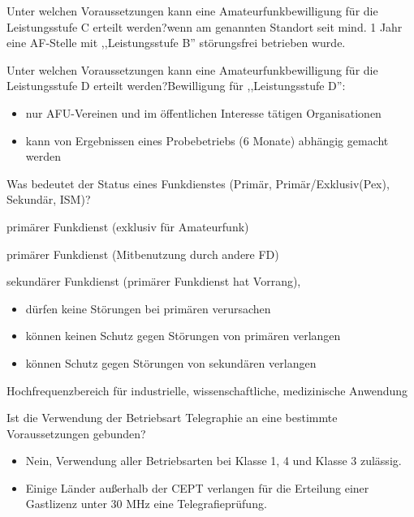 \documentclass[avery5371,grid,frame,a4paper]{flashcards}
\newcommand{\card}[3]{
  \begin{flashcard}[{\chap} -- #1]{#2}#3\end{flashcard}
}
\begin{document}
\card{43}{Unter welchen Voraussetzungen kann eine Amateurfunkbewilligung für die Leistungsstufe C erteilt werden?}{wenn am genannten Standort seit mind. 1 Jahr eine AF-Stelle mit ,,Leistungsstufe B'' störungsfrei betrieben wurde.}

\card{44}{Unter welchen Voraussetzungen kann eine Amateurfunkbewilligung für die Leistungsstufe D erteilt werden?}{Bewilligung für ,,Leistungsstufe D'': \begin{itemize}\itemsep1pt \item nur AFU-Vereinen und im öffentlichen Interesse tätigen Organisationen \item kann von Ergebnissen eines Probebetriebs (6 Monate) abhängig gemacht werden\end{itemize}}

\card{45}{Was bedeutet der Status eines Funkdienstes (Primär, Primär/Exklusiv(Pex), Sekundär, ISM)?}{\small
  \begin{description}\itemsep0pt
    \item[Pex] primärer Funkdienst (exklusiv für Amateurfunk)
    \item[P] primärer Funkdienst (Mitbenutzung durch andere FD)
    \item[S] sekundärer Funkdienst (primärer Funkdienst hat Vorrang),
      \begin{itemize}[leftmargin=0pt,itemsep=0pt]
        \item dürfen keine Störungen bei primären verursachen
        \item können keinen Schutz gegen Störungen von primären verlangen
        \item können Schutz gegen Störungen von sekundären verlangen
      \end{itemize}
    \item[ISM] Hochfrequenzbereich für industrielle, wissenschaftliche, medizinische Anwendung
  \end{description}
}

\card{46}{Ist die Verwendung der Betriebsart Telegraphie an eine bestimmte Voraussetzungen gebunden?}{\begin{itemize}\itemsep1pt \item Nein, Verwendung aller Betriebsarten bei Klasse 1, 4 und Klasse 3 zulässig. \item Einige Länder außerhalb der CEPT verlangen für die Erteilung einer Gastlizenz
unter 30 MHz eine Telegrafieprüfung.\end{itemize}}
\end{document}
